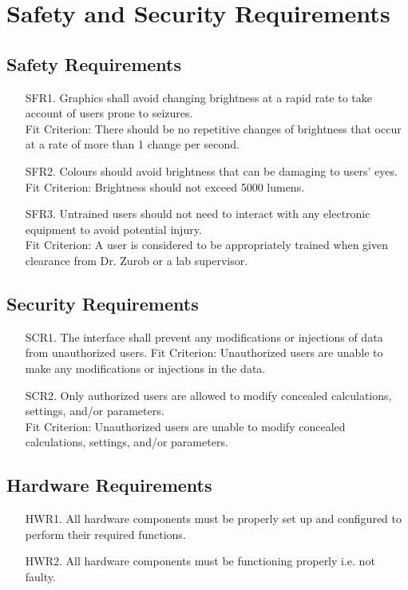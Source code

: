 \documentclass{article}
\begin{document}
\section{Safety and Security Requirements}

\subsection*{Safety Requirements}
\begin{enumerate}
  \item[SFR1.] Graphics shall avoid changing brightness at a rapid rate to take account of users prone to seizures.\\
  Fit Criterion: There should be no repetitive changes of brightness that occur at a rate of more than 1 change per second.
  \item[SFR2.] Colours should avoid brightness that can be damaging to users' eyes.\\
  Fit Criterion: Brightness should not exceed 5000 lumens.
  \item[SFR3.] Untrained users should not need to interact with any electronic equipment to avoid potential injury.\\
  Fit Criterion: A user is considered to be appropriately trained when given clearance from Dr. Zurob or a lab supervisor.
\end{enumerate}

\subsection*{Security Requirements}
\begin{enumerate}
  \item[SCR1.] The interface shall prevent any modifications or injections of data from unauthorized users. 
  Fit Criterion: Unauthorized users are unable to make any modifications or injections in the data.
  \item[SCR2.] Only authorized users are allowed to modify concealed calculations, settings, and/or parameters. \\
  Fit Criterion: Unauthorized users are unable to modify concealed calculations, settings, and/or parameters.
\end{enumerate}

\subsection*{Hardware Requirements}
\begin{enumerate}
  \item[HWR1.] All hardware components must be properly set up and configured to perform their required functions. 
  \item[HWR2.] All hardware components must be functioning properly i.e. not faulty. \\
\end{enumerate} 
\end{document}
